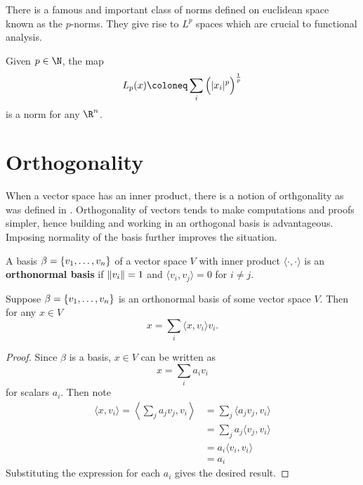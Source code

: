 \documentclass{subfiles}
\begin{document}
There is a famous and important class of norms defined on euclidean space known as the $p$-norms. They give rise to $L^p$ spaces which are crucial to functional analysis.

\begin{definition}[$L_p$ Norm]
    Given $p \in \N$, the map
    \[
        L_p(x) \coloneq \sum_{i} \qty\Big(|x_i|^p)^\frac{1}{p}
    \]
    is a norm for any $\R^n$.
\end{definition}

\chapter{Orthogonality}

When a vector space has an inner product, there is a notion of orthgonality as was defined in . Orthogonality of vectors tends to make computations and proofs simpler, hence building and working in an orthogonal basis is advantageous. Imposing normality of the basis further improves the situation.

\begin{definition}
    A basis $\beta = \qty{v_1, \ldots, v_n}$ of a vector space $V$ with inner product $\langle \cdot, \cdot \rangle$ is an \textbf{orthonormal basis} if $\norm{v_i} = 1$ and $\langle v_i, v_j \rangle = 0$ for $i \neq j$.
\end{definition}

\begin{theorem}
    Suppose $\beta = \qty{v_1, \ldots, v_n}$ is an orthonormal basis of some vector space $V$. Then for any $x \in V$
    \[
        x = \sum_{i} \langle x, v_i \rangle v_i
    .\]
\end{theorem}

\begin{proof}
    Since $\beta$ is a basis, $x \in V$ can be written as
    \[
        x = \sum_{i} a_i v_i
    \]
    for scalars $a_i$. Then note
    \begin{align*}
        \langle x, v_i \rangle = \left\langle \sum_{j} a_j v_j, v_i \right\rangle &= \sum_{j} \langle a_j v_j, v_i \rangle \\
        &= \sum_j a_j \langle v_j, v_i \rangle \\
        &= a_i \langle v_i, v_i \rangle \\
        &= a_i
    \end{align*}
     Substituting the expression for each $a_i$ gives the desired result.
\end{proof}
\end{document}
